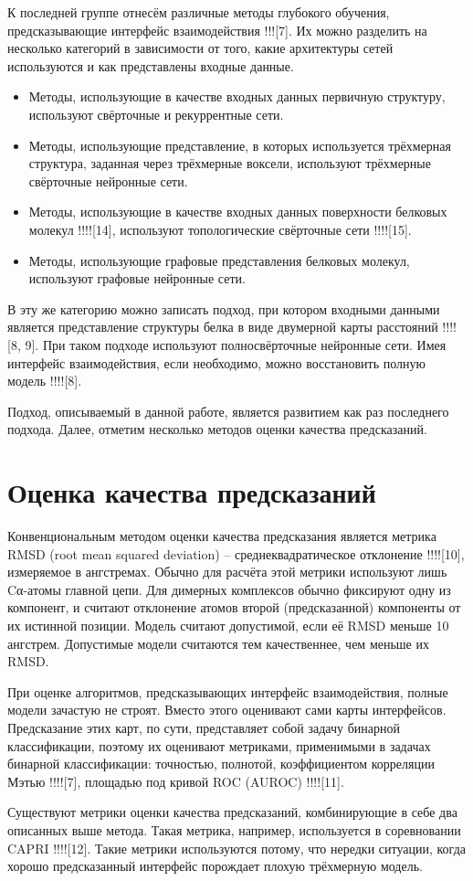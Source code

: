 К последней группе отнесём различные методы глубокого обучения, предсказывающие интерфейс взаимодействия !!![7]. Их можно разделить на несколько категорий в зависимости от того, какие архитектуры сетей используются и как представлены входные данные.
\begin{itemize}
\item Методы, использующие в качестве входных данных первичную структуру, используют свёрточные и рекуррентные сети.
\item Методы, использующие представление, в которых используется трёхмерная структура, заданная через трёхмерные воксели, используют трёхмерные свёрточные нейронные сети.
\item Методы, использующие в качестве входных данных поверхности белковых молекул !!!![14], используют топологические свёрточные сети !!!![15].
\item Методы, использующие графовые представления белковых молекул, используют графовые нейронные сети.
\end{itemize}
В эту же категорию можно записать подход, при котором входными данными является представление структуры белка в виде двумерной карты расстояний !!!![8, 9]. При таком подходе используют полносвёрточные нейронные сети. Имея интерфейс взаимодействия, если необходимо, можно восстановить полную модель !!!![8].

Подход, описываемый в данной работе, является развитием как раз последнего подхода. Далее, отметим несколько методов оценки качества предсказаний.
\section{Оценка качества предсказаний}

Конвенциональным методом оценки качества предсказания является метрика RMSD (root mean squared deviation) – среднеквадратическое отклонение !!!![10], измеряемое в ангстремах. Обычно для расчёта этой метрики  используют лишь Cα-атомы главной цепи. Для димерных комплексов обычно фиксируют одну из компонент, и считают отклонение атомов второй (предсказанной) компоненты от их истинной позиции. Модель считают допустимой, если её RMSD меньше 10 ангстрем. Допустимые модели считаются тем качественнее, чем меньше их RMSD.

При оценке алгоритмов, предсказывающих интерфейс взаимодействия, полные модели зачастую не строят. Вместо этого оценивают сами карты интерфейсов. Предсказание этих карт, по сути, представляет собой задачу бинарной классификации, поэтому их оценивают метриками, применимыми в задачах бинарной классификации: точностью, полнотой, коэффициентом корреляции Мэтью !!!![7], площадью под кривой ROC (AUROC) !!!![11].

Существуют метрики оценки качества предсказаний, комбинирующие в себе два описанных выше метода. Такая метрика, например, используется в соревновании CAPRI !!!![12]. Такие метрики используются потому, что нередки ситуации, когда хорошо предсказанный интерфейс порождает плохую трёхмерную модель.









